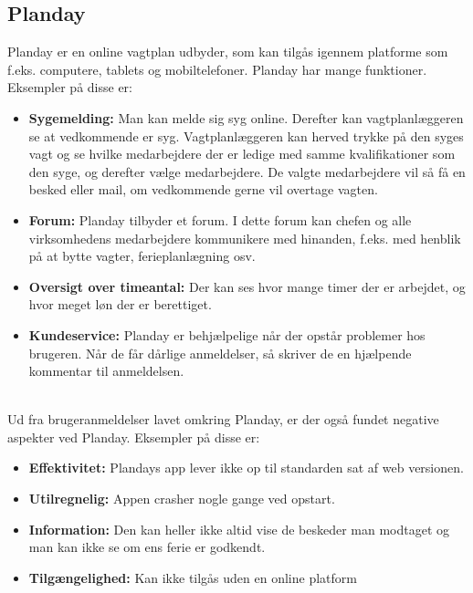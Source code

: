 \subsection{Planday}
Planday er en online vagtplan udbyder, som kan tilgås igennem platforme som f.eks. computere, tablets og mobiltelefoner. Planday har mange funktioner. Eksempler på disse er:
\begin{itemize}
\item {\textbf{Sygemelding:} Man kan melde sig syg online. Derefter kan vagtplanlæggeren se at vedkommende er syg. Vagtplanlæggeren kan herved trykke på den syges vagt og se hvilke medarbejdere der er ledige med samme kvalifikationer som den syge, og derefter vælge medarbejdere. De valgte medarbejdere vil så få en besked eller mail, om vedkommende gerne vil overtage vagten.}
\item {\textbf{Forum:} Planday tilbyder et forum. I dette forum kan chefen og alle virksomhedens medarbejdere kommunikere med hinanden, f.eks. med henblik på at bytte vagter, ferieplanlægning osv.}
\item {\textbf{Oversigt over timeantal:} Der kan ses hvor mange timer der er arbejdet, og hvor meget løn der er berettiget.}
\item {\textbf{Kundeservice:} Planday er behjælpelige når der opstår problemer hos brugeren. Når de får dårlige anmeldelser, så skriver de en hjælpende kommentar til anmeldelsen.} 
\end{itemize} 
\citep{DanskInternetHandel, Simonsen2014, Planday}\\

\noindent Ud fra brugeranmeldelser lavet omkring Planday, er der også fundet negative aspekter ved Planday. Eksempler på disse er:
\begin{itemize}
\item {\textbf{Effektivitet:} Plandays app lever ikke op til standarden sat af web versionen.} 
\item {\textbf{Utilregnelig:} Appen crasher nogle gange ved opstart.}
\item {\textbf{Information:} Den kan heller ikke altid vise de beskeder man modtaget og man kan ikke se om ens ferie er godkendt.} 
\item {\textbf{Tilgængelighed:} Kan ikke tilgås uden en online platform} \end{itemize}
\citep{Play}\\


